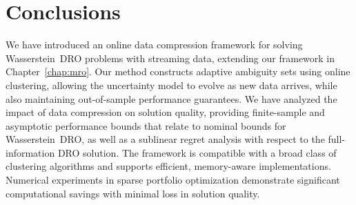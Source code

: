 




\section{Conclusions}
\label{c3:sec:conclusions}
We have introduced an online data compression framework for solving Wasserstein~\gls{DRO} problems with streaming data, extending our framework in Chapter~\ref{chap:mro}. 
Our method constructs adaptive ambiguity sets using online clustering, allowing the uncertainty model to evolve as new data arrives, while also maintaining out-of-sample performance guarantees. 
We have analyzed the impact of data compression on solution quality, providing finite-sample and asymptotic performance bounds that relate to nominal bounds for Wasserstein~\gls{DRO}, as well as a sublinear regret analysis with respect to the full-information \gls{DRO} solution. 
The framework is compatible with a broad class of clustering algorithms and supports efficient, memory-aware implementations. 
Numerical experiments in sparse portfolio optimization demonstrate significant computational savings with minimal loss in solution quality.

